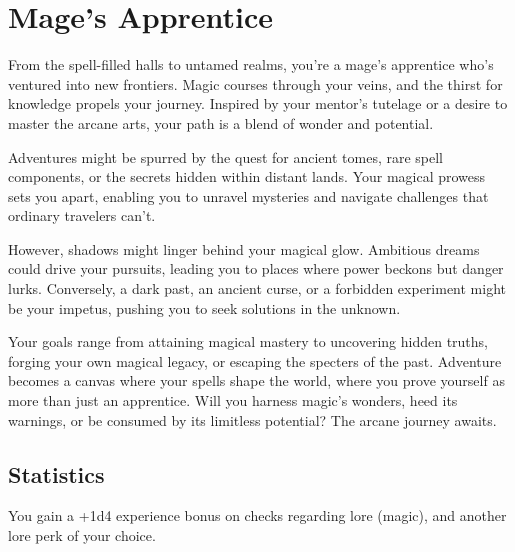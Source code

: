 \section{Mage's Apprentice}\label{background:mageApprentice}
From the spell-filled halls to untamed realms, you're a mage's apprentice who's ventured into new frontiers.
Magic courses through your veins, and the thirst for knowledge propels your journey.
Inspired by your mentor's tutelage or a desire to master the arcane arts, your path is a blend of wonder and potential.

Adventures might be spurred by the quest for ancient tomes, rare spell components, or the secrets hidden within distant lands.
Your magical prowess sets you apart, enabling you to unravel mysteries and navigate challenges that ordinary travelers can't.

However, shadows might linger behind your magical glow.
Ambitious dreams could drive your pursuits, leading you to places where power beckons but danger lurks.
Conversely, a dark past, an ancient curse, or a forbidden experiment might be your impetus, pushing you to seek solutions in the unknown.

Your goals range from attaining magical mastery to uncovering hidden truths, forging your own magical legacy, or escaping the specters of the past.
Adventure becomes a canvas where your spells shape the world, where you prove yourself as more than just an apprentice.
Will you harness magic's wonders, heed its warnings, or be consumed by its limitless potential?
The arcane journey awaits.

\subsection{Statistics}
You gain a +1d4 experience bonus on checks regarding lore (magic), and another lore perk of your choice.
